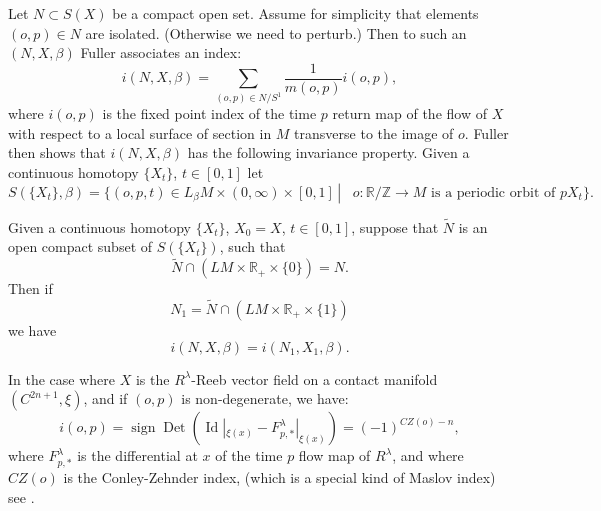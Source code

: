 \documentclass{amsart}
\numberwithin{equation}{section}
\theoremstyle{definition}
\theoremstyle{remark}
\DeclareMathOperator {\sign} {sign}
\DeclareMathOperator {\Id} {Id}
\DeclareMathOperator {\Det} {Det}
\begin{document}
\begin {appendices}
Let $N \subset S (X) $ be a compact open set.
Assume for simplicity that elements $(o,p) \in N$  are
isolated. (Otherwise we need to perturb.) Then
to such an $(N,X, \beta)$
Fuller associates an index: 
\begin{equation*}
   i (N,X, \beta) = \sum _{(o,p) \in N/ S ^{1}}  \frac{1}{m
   (o,p)} i (o,p),
\end{equation*}
 where $i (o,p)$ is the fixed point index of the time $p$ return
map of the flow of $X$ with respect to
a local surface of section in $M$ transverse to the image of $o$. 
Fuller then shows that $i (N, X, \beta )$ has the following invariance property.
Given a continuous homotopy $\{X _{t}
\}$,  $t \in [0,1]$ let \begin{equation*}  S ( \{X _{t} \}, \beta) = 
   \{(o, p, t) \in L _{\beta} M \times (0, \infty) \times [0,1] \,\left .  \right | \, \text{ $o: \mathbb{R}/\mathbb{Z} \to M $ is a
   periodic orbit of $p X _{t}  $} \}.
\end{equation*}


Given a continuous homotopy $\{X _{t}
\}$, $X _{0} =X $, $t \in [0,1]$, suppose that $\widetilde{N} $ is an open compact subset of $S (\{X _{t} \})$, such that $$\widetilde{N} \cap \left (LM \times   \mathbb{R} _{+} \times \{0\} \right) =N.
$$ Then if $$N_1 = \widetilde{N} \cap \left (LM \times   \mathbb{R} _{+}  \times \{1\} \right) $$ we have \begin{equation*}
i (N, X, \beta ) = i (N_1, X_1, \beta).
\end{equation*} 


In the case where $X$ is the $R ^{\lambda} $-Reeb vector field on a contact manifold $(C ^{2n+1} , \xi)$,
and if $(o,p)$ is
non-degenerate, we have: 
\begin{equation} \label{eq:conleyzenhnder}
i (o,p) = \sign \Det (\Id|
   _{\xi (x)}  - F _{p, *}
^{\lambda}| _{\xi (x)}   ) = (-1)^{CZ (o)-n},
\end{equation}
where $F _{p, *}
    ^{\lambda}$ is the differential at $x$ of the time $p$ flow map of $R ^{\lambda} $,
    and where $CZ ( o)$ is the Conley-Zehnder index, (which is a special
    kind of Maslov index) see
    \cite{citeRobbinSalamonTheMaslovindexforpaths.}.


\end{appendices}
\end{document}
